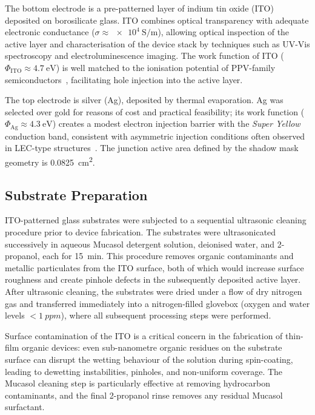 \documentclass[12pt, a4paper, twoside]{report}
\newcommand{\SY}{\textit{Super Yellow}}
\newcommand{\ITO}{indium tin oxide}
\begin{document}
The bottom electrode is a pre-patterned layer of \ITO{} (ITO) deposited on borosilicate glass. ITO combines optical transparency with adequate electronic conductance ($\sigma \approx \SI{e4}{\siemens\per\metre}$), allowing optical inspection of the active layer and characterisation of the device stack by techniques such as UV-Vis spectroscopy and electroluminescence imaging. The work function of ITO ($\Phi_{\mathrm{ITO}} \approx \SI{4.7}{\electronvolt}$) is well matched to the ionisation potential of PPV-family semiconductors~\cite{Ramsdale2002}, facilitating hole injection into the active layer.

The top electrode is silver (Ag), deposited by thermal evaporation. Ag was selected over gold for reasons of cost and practical feasibility; its work function ($\Phi_{\mathrm{Ag}} \approx \SI{4.3}{\electronvolt}$) creates a modest electron injection barrier with the \SY{} conduction band, consistent with asymmetric injection conditions often observed in LEC-type structures~\cite{deMello1998}. The junction active area defined by the shadow mask geometry is \SI{0.0825}{\square\centi\metre}.

\subsection{Substrate Preparation}\label{subsec:substrate_prep}

ITO-patterned glass substrates were subjected to a sequential ultrasonic cleaning procedure prior to device fabrication. The substrates were ultrasonicated successively in aqueous Mucasol detergent solution, deionised water, and 2-propanol, each for \SI{15}{\minute}. This procedure removes organic contaminants and metallic particulates from the ITO surface, both of which would increase surface roughness and create pinhole defects in the subsequently deposited active layer. After ultrasonic cleaning, the substrates were dried under a flow of dry nitrogen gas and transferred immediately into a nitrogen-filled glovebox (oxygen and water levels $< \SI{1}{ppm}$), where all subsequent processing steps were performed.

Surface contamination of the ITO is a critical concern in the fabrication of thin-film organic devices: even sub-nanometre organic residues on the substrate surface can disrupt the wetting behaviour of the solution during spin-coating, leading to dewetting instabilities, pinholes, and non-uniform coverage. The Mucasol cleaning step is particularly effective at removing hydrocarbon contaminants, and the final 2-propanol rinse removes any residual Mucasol surfactant.
\end{document}
